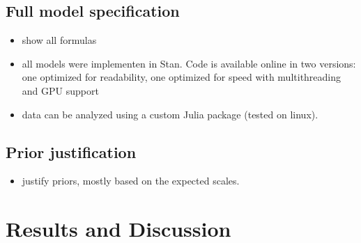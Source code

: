\documentclass[fleqn,11pt]{SelfArx} %
\begin{document}
\subsection*{Full model specification}
\begin{itemize}
  \item show all formulas
  \item all models were implementen in Stan. Code is available online in two versions:
  one optimized for readability, one optimized for speed with multithreading and GPU support
  \item data can be analyzed using a custom Julia package (tested on linux).
\end{itemize}

\subsection*{Prior justification}
\begin{itemize}
  \item justify priors, mostly based on the expected scales.
\end{itemize}

\section{Results and Discussion}

\thispagestyle{empty} %


\FloatBarrier



\end{document}
